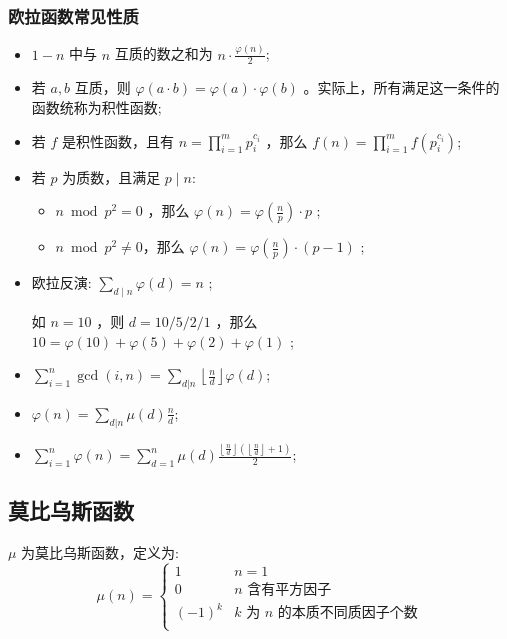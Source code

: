 \subsubsection{欧拉函数常见性质}
\begin{itemize}
    \item $1-n$ 中与 $n$ 互质的数之和为 $n \cdot \frac{\varphi(n)}{2}$;
    \item 若 $a,b$ 互质，则 $\varphi (a \cdot b) = \varphi (a)  \cdot \varphi(b)$ 。实际上，所有满足这一条件的函数统称为积性函数;
    \item 若 $f$ 是积性函数，且有 $\displaystyle n = \prod ^m _{i =1} p_i ^ {c_i}$ ，那么 $\displaystyle f(n) = \prod ^m _{i =1} f( p_i ^ {c_i} )$;
    
    \item 若 $p$ 为质数，且满足 $p \mid  n$:
    \begin{itemize}
        \item $n \bmod p^2 = 0$ ，那么 $\varphi (n) = \varphi (\frac{n}{p})  \cdot p$ ;
        \item $n \bmod p^2 \neq 0$，那么 $\varphi (n) = \varphi (\frac{n}{p})  \cdot (p-1)$ ;
    \end{itemize}
    \item 欧拉反演: $\displaystyle\sum _{d \mid n} \varphi (d)= n$ ;

          如 $n=10$ ，则 $d=10/5/2/1$ ，那么 $10 = \varphi(10) + \varphi(5) + \varphi(2) + \varphi(1)$ ;
    \item $\displaystyle\sum_{i = 1}^{n} \gcd(i, n) = \sum_{d|n} \left\lfloor \frac{n}{d} \right\rfloor \varphi(d)$;
    \item $\varphi(n) = \displaystyle\sum_{d | n} \mu(d) \frac{n}{d}$;
    \item $\displaystyle\sum_{i = 1}^n\varphi(n) = \displaystyle\sum_{d = 1}^n \mu(d) \frac{\left\lfloor \frac{n}{d} \right\rfloor(\left\lfloor \frac{n}{d} \right\rfloor + 1)}{2}$;
\end{itemize}


\subsection{莫比乌斯函数}
$\mu$ 为莫比乌斯函数，定义为:
        $$\mu(n)= \begin{cases}
        1&n=1\\
        0&n\text{ 含有平方因子}\\
        (-1)^k&k\text{ 为 }n\text{ 的本质不同质因子个数}\\
        \end{cases}$$
